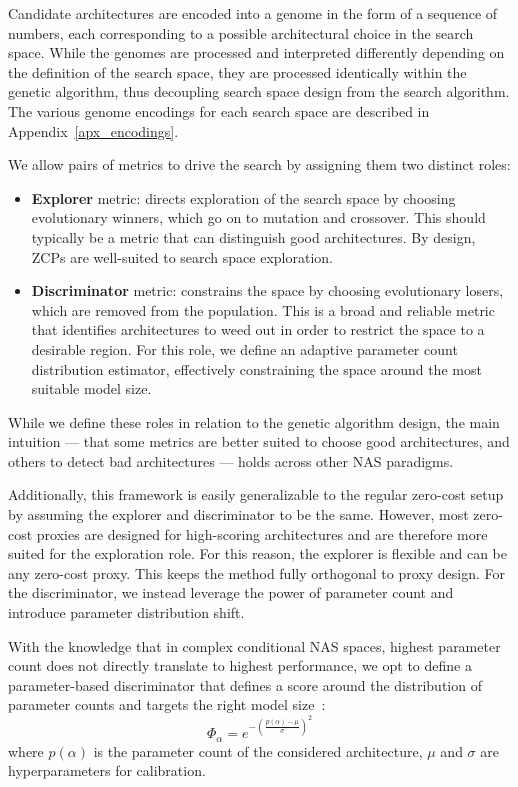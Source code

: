 \documentclass[10pt]{article} %
\begin{document}
Candidate architectures are encoded into a genome in the form of a sequence of numbers, each corresponding to a possible architectural choice in the search space. While the genomes are processed and interpreted differently depending on the definition of the search space, they are processed identically within the genetic algorithm, thus decoupling search space design from the search algorithm. The various genome encodings for each search space are described in Appendix~\ref{apx_encodings}.

We allow pairs of metrics to drive the search by assigning them two distinct roles:
\begin{itemize}
\item \textbf{Explorer} metric: directs exploration of the search space by choosing evolutionary winners, which go on to mutation and crossover. This should typically be a metric that can distinguish good architectures. By design, ZCPs are well-suited to search space exploration.

\item \textbf{Discriminator} metric: constrains the space by choosing evolutionary losers, which are removed from the population. This is a broad and reliable metric that identifies architectures to weed out in order to restrict the space to a desirable region. For this role, we define an adaptive parameter count distribution estimator, effectively constraining the space around the most suitable model size.
\end{itemize}

While we define these roles in relation to the genetic algorithm design, the main intuition --- that some metrics are better suited to choose good architectures, and others to detect bad architectures --- holds across other NAS paradigms. 

Additionally, this framework is easily generalizable to the regular zero-cost setup by assuming the explorer and discriminator to be the same. However, most zero-cost proxies are designed for high-scoring architectures and are therefore more suited for the exploration role. For this reason, the explorer is flexible and can be any zero-cost proxy. This keeps the method fully orthogonal to proxy design. For the discriminator, we instead leverage the power of parameter count and introduce parameter distribution shift.

With the knowledge that in complex conditional NAS spaces, highest parameter count does not directly translate to highest performance, we opt to define a parameter-based discriminator that defines a score around the distribution of parameter counts and targets the right model size~:
$$
\Phi_\alpha = e^{-\left(\frac{p(\alpha) - \mu}{\sigma}\right)^2}
$$
where $p(\alpha)$ is the parameter count of the considered architecture, $\mu$ and $\sigma$ are hyperparameters for calibration.
\end{document}
